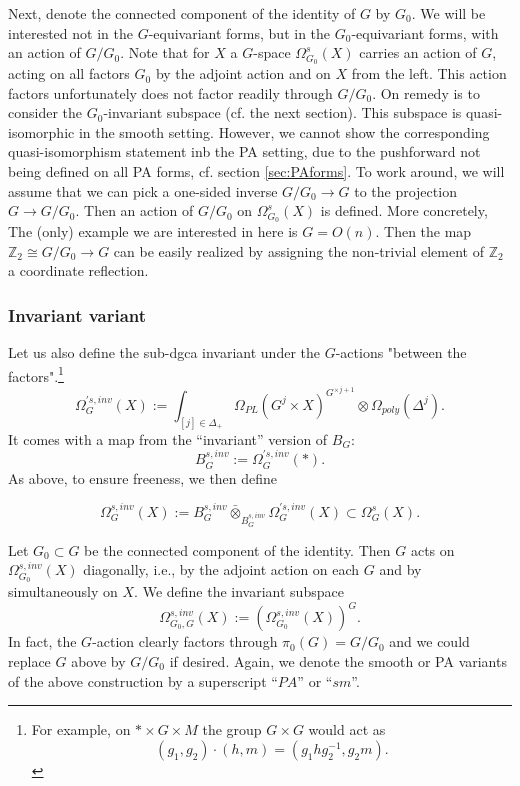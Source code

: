 \documentclass[a4paper]{amsart}
\theoremstyle{plain}
\theoremstyle{definition}
\newcommand{\Z}{{\mathbb{Z}}}
\newcommand{\beq}[1]{
\begin{equation}\label{#1}
}
\newcommand{\eeq}{
\end{equation}
}
\begin{document}
Next, denote the connected component of the identity of $G$ by $G_0$.
We will be interested not in the $G$-equivariant forms, but in the $G_0$-equivariant forms, with an action of $G/G_0$.
Note that for $X$ a $G$-space $\Omega_{G_0}^s(X)$ carries an action of $G$, acting on all factors $G_0$ by the adjoint action and on $X$ from the left.
This action factors unfortunately does not factor readily through $G/G_0$.
On remedy is to consider the $G_0$-invariant subspace (cf. the next section).
This subspace is quasi-isomorphic in the smooth setting. However, we cannot show the corresponding quasi-isomorphism statement inb the PA setting, due to the pushforward not being defined on all PA forms, cf. section \ref{sec:PAforms}.
To work around, we will assume that we can pick a one-sided inverse $G/G_0\to G$ to the projection $G\to G/G_0$.
Then an action of $G/G_0$ on $\Omega_{G_0}^s(X)$ is defined.
More concretely, The (only) example we are interested in here is $G=O(n)$.
Then the map $\Z_2\cong G/G_0\to G$ can be easily realized by assigning the non-trivial element of $\Z_2$ a coordinate reflection.



\subsubsection{Invariant variant}\label{sec:invariant variant}
Let us also define the sub-dgca invariant under the $G$-actions "between the factors".\footnote{For example, on $*\times G\times M$ the group $G\times G$ would act as 
\[
(g_1,g_2) \cdot (h, m) = (g_1h g_2^{-1}, g_2 m).
\]
}
\[
\Omega_G^{'s,inv}(X) := \int_{[j]\in \Delta_+} \Omega_{PL}(G^j\times X)^{G^{\times j+1}} \otimes \Omega_{poly}(\Delta^j).
\]
It comes with a map from the ``invariant'' version of $B_G$:
\[
B_G^{s,inv} := \Omega_G^{'s,inv}(*).
\]
As above, to ensure freeness, we then define 
\beq{equ:invinclusion}
 \Omega_G^{s,inv}(X) := B_G^{s,inv} \bar \otimes_{B_G^{s,inv}} \Omega_G^{'s,inv}(X) \subset \Omega_G^{s}(X).
\eeq




Let $G_0\subset G$ be the connected component of the identity.
Then $G$ acts on $\Omega_{G_0}^{s, inv}(X)$ diagonally, i.e., by the adjoint action on each $G$ and by simultaneously on $X$. We define the invariant subspace
\[
\Omega_{G_0,G}^{s, inv}(X) := \left( \Omega_{G_0}^{s, inv}(X) \right)^{G}.
\] 
In fact, the $G$-action clearly factors through $\pi_0(G)=G/G_0$ and we could replace $G$ above by $G/G_0$ if desired.
Again, we denote the smooth or PA variants of the above construction by a superscript ``$PA$'' or ``$sm$''.
\end{document}
